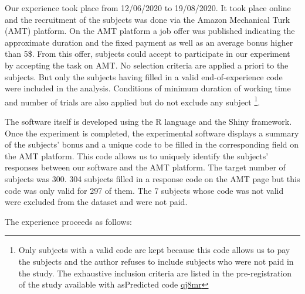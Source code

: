\documentclass[
]{book}
\begin{document}
Our experience took place from 12/06/2020 to 19/08/2020.
It took place online and the recruitment of the subjects was done via the Amazon
Mechanical Turk (AMT) platform.
On the AMT platform a job offer was published indicating the approximate
duration and the fixed payment as well as an average bonus higher than 5\$.
From this offer, subjects could accept to participate in our experiment by
accepting the task on AMT.
No selection criteria are applied a priori to the subjects. But only the subjects having filled in a valid end-of-experience code were included in the analysis. Conditions of minimum duration of working time and number of trials are also applied but do not exclude any subject \footnote{Only subjects with a valid code are kept because this code allows us to pay the subjects and the author refuses to include subjects who were not paid in the study. The exhaustive inclusion criteria are listed in the pre-registration of the study available with asPredicted code
  \href{https://aspredicted.org/qj8mr.pdf}{qj8mr}}.

The software itself is developed using the R language and the Shiny framework.
Once the experiment is completed, the experimental software displays a summary
of the subjects' bonus and a unique code to be filled in the corresponding field
on the AMT platform.
This code allows us to uniquely identify the subjects' responses between our
software and the AMT platform.
The target number of subjects was 300.
304 subjects filled in a response code on the AMT page but this code was only
valid for 297 of them.
The 7 subjects whose code was not valid were excluded from the dataset and were
not paid.

The experience proceeds
as follows:
\end{document}
